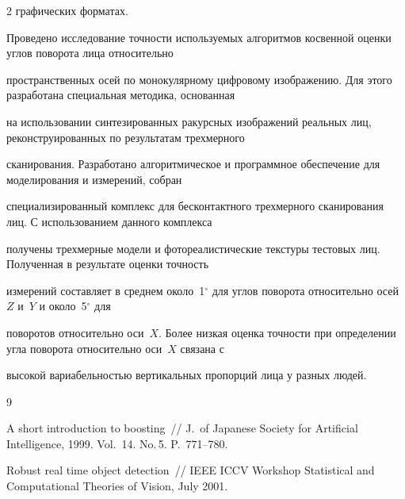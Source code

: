 \begin{multicols}{2}
графических форматах. 





Проведено исследование точности ис\-поль\-зу\-емых алгоритмов косвенной оценки углов поворота лица относительно 


пространственных осей по монокулярному цифровому изображению. Для этого разработана специальная методика, основанная 


на использовании синтезированных ракурсных изоб\-ра\-же\-ний реальных лиц, реконструированных по результатам трехмерного 


сканирования. Разработано алгоритмическое и программное обеспечение для моделирования и измерений, собран 


специализированный комплекс для бесконтактного трехмерного сканирования лиц. С использованием данного комплекса 


получены трехмерные модели и фотореалистические текстуры тестовых лиц. Полученная в результате оценки точность 


измерений составляет в среднем около~1$^\circ$ для углов поворота относительно осей~$Z$ и~$Y$ и около~5$^\circ$ для 


поворотов относительно оси~$X$. Более низкая оценка точности при определении угла поворота относительно оси~$X$ связана с 


высокой вариабельностью вертикальных пропорций лица у разных людей.





{\small\frenchspacing


{%




\begin{thebibliography}{9}









A short introduction to boosting~// J.~of Japanese Society for Artificial Intelligence, 1999. Vol.~14. No.\,5. P.~771--780.









Robust real time object detection~// IEEE ICCV Workshop Statistical and Computational Theories of Vision, July 2001.






\end{thebibliography}}}
\end{multicols}
